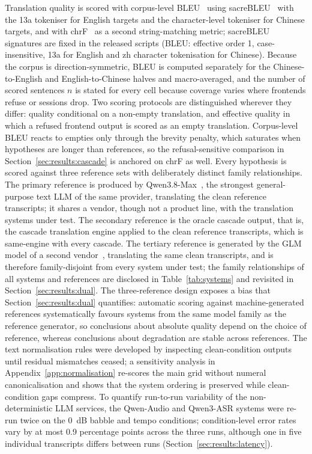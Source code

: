 Translation quality is scored with corpus-level BLEU~\cite{papineni2002bleu}
using sacreBLEU~\cite{post2018call} with the 13a tokeniser for English
targets and the character-level tokeniser for Chinese targets, and with
chrF~\cite{popovic2015chrf} as a second string-matching metric; sacreBLEU
signatures are fixed in the released scripts (BLEU: effective order 1,
case-insensitive, 13a for English and zh character tokenisation for
Chinese). Because the
corpus is direction-symmetric, BLEU is computed separately for the
Chinese-to-English and English-to-Chinese halves and macro-averaged, and
the number of scored sentences $n$ is stated for every cell because
coverage varies where frontends refuse or sessions drop. Two scoring
protocols are distinguished wherever they differ: quality conditional on a
non-empty translation, and effective quality in which a refused frontend
output is scored as an empty translation. Corpus-level BLEU reacts to
empties only through the brevity penalty, which saturates when hypotheses
are longer than references, so the refusal-sensitive comparison in
Section~\ref{sec:results:cascade} is anchored on chrF as well. Every
hypothesis is scored against three reference sets with deliberately
distinct family relationships. The primary reference is
produced by Qwen3.8-Max~\cite{qwen3technical2025}, the strongest
general-purpose text LLM of the same provider, translating the clean
reference transcripts; it shares a vendor, though not a product line, with
the translation systems under test. The secondary reference is the oracle
cascade output, that is, the cascade translation engine applied to the clean
reference transcripts, which is same-engine with every cascade. The
tertiary reference is generated by the GLM model of a second
vendor~\cite{glm2026api,glm2025tech},
translating the same clean transcripts,
and is therefore family-disjoint from every system under test; the family
relationships of all systems and references are disclosed in
Table~\ref{tab:systems} and revisited in
Section~\ref{sec:results:dual}. The three-reference design exposes a bias
that Section~\ref{sec:results:dual} quantifies: automatic scoring against
machine-generated references systematically favours systems from the same
model family as the reference generator, so conclusions about absolute
quality depend on the choice of reference, whereas conclusions about
degradation are stable across references. The text normalisation rules were developed by
inspecting clean-condition outputs until residual mismatches ceased; a
sensitivity analysis in Appendix~\ref{app:normalisation} re-scores the
main grid without numeral canonicalisation and shows that the
system ordering is preserved while clean-condition gaps compress. To
quantify run-to-run variability of the non-deterministic LLM services, the
Qwen-Audio and Qwen3-ASR systems were re-run twice on the 0~dB babble and
tempo conditions; condition-level error rates vary by at most 0.9
percentage points across the three runs, although one in five individual
transcripts differs between runs (Section~\ref{sec:results:latency}).

